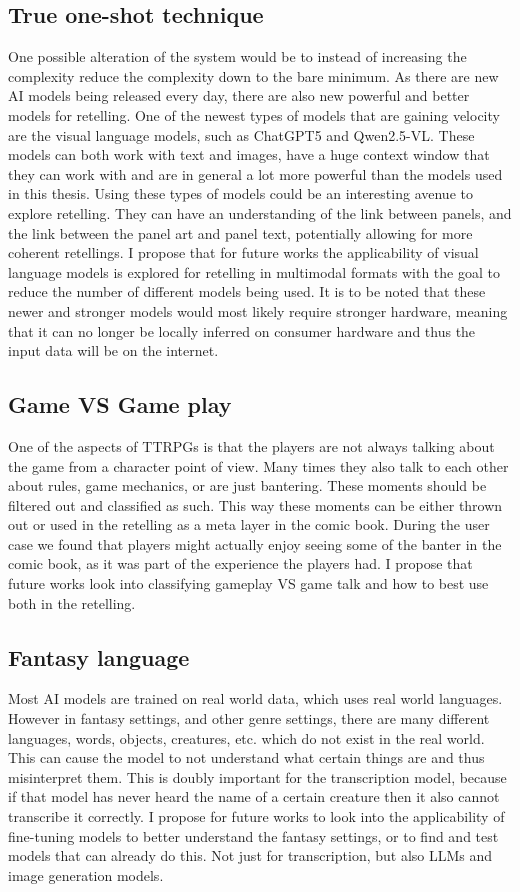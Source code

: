 \subsection*{True one-shot technique}
One possible alteration of the system would be to instead of increasing the complexity reduce the complexity down to the bare minimum. As there are new AI models being released every day, there are also new powerful and better models for retelling. One of the newest types of models that are gaining velocity are the visual language models, such as ChatGPT5 and Qwen2.5-VL\cite{qwen2.5-VL}. These models can both work with text and images, have a huge context window that they can work with and are in general a lot more powerful than the models used in this thesis. Using these types of models could be an interesting avenue to explore retelling. They can have an understanding of the link between panels, and the link between the panel art and panel text, potentially allowing for more coherent retellings. I propose that for future works the applicability of visual language models is explored for retelling in multimodal formats with the goal to reduce the number of different models being used. It is to be noted that these newer and stronger models would most likely require stronger hardware, meaning that it can no longer be locally inferred on consumer hardware and thus the input data will be on the internet.

\subsection*{Game VS Game play}
One of the aspects of TTRPGs is that the players are not always talking about the game from a character point of view. Many times they also talk to each other about rules, game mechanics, or are just bantering. These moments should be filtered out and classified as such. This way these moments can be either thrown out or used in the retelling as a meta layer in the comic book. During the user case we found that players might actually enjoy seeing some of the banter in the comic book, as it was part of the experience the players had. I propose that future works look into classifying gameplay VS game talk and how to best use both in the retelling.

\subsection*{Fantasy language}
Most AI models are trained on real world data, which uses real world languages. However in fantasy settings, and other genre settings, there are many different languages, words, objects, creatures, etc. which do not exist in the real world. This can cause the model to not understand what certain things are and thus misinterpret them. This is doubly important for the transcription model, because if that model has never heard the name of a certain creature then it also cannot transcribe it correctly. I propose for future works to look into the applicability of fine-tuning models to better understand the fantasy settings, or to find and test models that can already do this. Not just for transcription, but also LLMs and image generation models.

